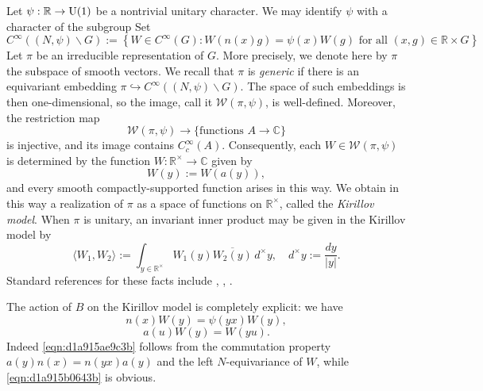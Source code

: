 \documentclass[reqno]{amsart} 
\numberwithin{equation}{section}
\begin{document}
Let $\psi : \mathbb{R} \rightarrow \operatorname{U}(1)$ be a nontrivial unitary character.  We may identify $\psi$ with a character of the subgroup
Set
\begin{equation*}
C^\infty((N,\psi) \backslash G) := \left\{ W \in C^\infty(G): W(n(x) g) = \psi(x) W(g) \text{ for all } (x,g) \in \mathbb{R} \times G \right\}
\end{equation*}
Let $\pi$ be an irreducible representation of $G$.  More precisely, we denote here by $\pi$ the subspace of smooth vectors.  We recall that $\pi$ is \emph{generic} if there is an equivariant embedding $\pi \hookrightarrow C^\infty((N,\psi) \backslash G)$.  The space of such embeddings is then one-dimensional, so the image, call it $\mathcal{W}(\pi,\psi)$, is well-defined.  Moreover, the restriction map
\begin{equation*}
\mathcal{W}(\pi,\psi) \rightarrow \{\text{functions } A \rightarrow \mathbb{C} \}
\end{equation*}
is injective, and its image contains $C_c^\infty(A)$.  Consequently, each $W \in \mathcal{W}(\pi,\psi)$ is determined by the function $W : \mathbb{R}^\times \rightarrow \mathbb{C}$ given by
\begin{equation*}
W(y) := W(a(y)),
\end{equation*}
and every smooth compactly-supported function arises in this way.  We obtain in this way a realization of $\pi$ as a space of functions on $\mathbb{R}^\times$, called the \emph{Kirillov model}.  When $\pi$ is unitary, an invariant inner product may be given in the Kirillov model by
\begin{equation}\label{eqn:d1a915c9af68}
 \langle W_1, W_2 \rangle := \int_{y \in \mathbb{R}^\times } W_1(y) \overline{W_2(y)} \, d^\times y, \quad
  d^\times y := \frac{d y}{\lvert y \rvert}.
\end{equation}
Standard references for these facts include \cite[\S6]{MR748505}, \cite[\S10.2]{MR1999922}, \cite{MR2733072}.

The action of $B$ on the Kirillov model is completely explicit: we have
\begin{equation}\label{eqn:d1a915ae9c3b}
n(x) W(y) = \psi(y x) W(y),
\end{equation}
\begin{equation}\label{eqn:d1a915b0643b}
a(u) W(y) = W(y u).
\end{equation}
Indeed \eqref{eqn:d1a915ae9c3b} follows from the commutation property $a(y) n(x) = n(y x) a(y)$ and the left $N$-equivariance of $W$, while \eqref{eqn:d1a915b0643b} is obvious.
\end{document}
